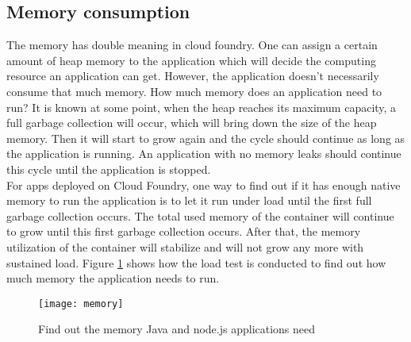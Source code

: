 \subsection{Memory consumption}
The memory has double meaning in cloud foundry. One can assign a certain amount of heap memory to the application which will decide the computing resource an application can get. However, the application doesn't necessarily consume that much memory. How much memory does an application need to run? It is known at some point, when the heap reaches its maximum capacity, a full garbage collection will occur, which will bring down the size of the heap memory. Then it will start to grow again and the cycle should continue as long as the application is running. An application with no memory leaks should continue this cycle until the application is stopped. \\
For apps deployed on Cloud Foundry, one way to find out if it has enough native memory to run the application is to let it run under load until the first full garbage collection occurs. The total used memory of the container will continue to grow until this first garbage collection occurs. After that, the memory utilization of the container will stabilize and will not grow any more with sustained load. Figure \ref{memory} shows how the load test is conducted to find out how much memory the application needs to run. 

\begin{figure}[h]
	\centering
	\texttt{[image: memory]}
	\caption{Find out the memory Java and node.js applications need }
	\label{memory}
\end{figure}